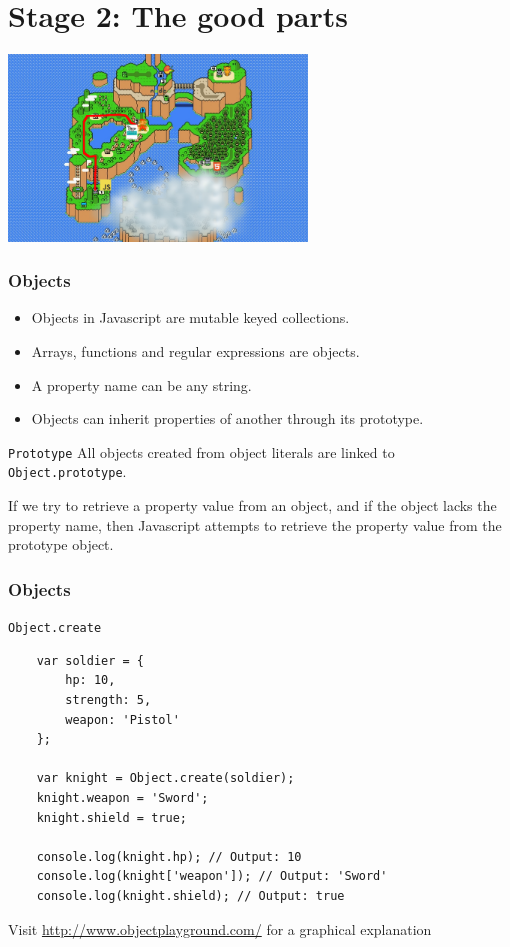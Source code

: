 \section{Stage 2: The good parts}

\begin{frame}[fragile]
  \begin{center}
    \includegraphics[width=300px]{images/map_stage_2.png}
  \end{center}
\end{frame}

\begin{frame}[fragile]
  \frametitle{Objects}
  \begin{itemize}
    \item Objects in Javascript are mutable keyed collections.
    \pause\item Arrays, functions and regular expressions are objects.
    \pause\item A property name can be any string.
    \pause\item Objects can inherit properties of another through its prototype.
  \end{itemize}

  \pause

  \begin{block}{\texttt{Prototype}}
    All objects created from object literals are linked to \texttt{Object.prototype}.
    \pause

    If we try to retrieve a property value from an object, and if the object lacks the property name, then Javascript attempts to retrieve the property value from the prototype object.
  \end{block}
\end{frame}

\begin{frame}[fragile]
  \frametitle{Objects}
  \begin{block}{\texttt{Object.create}}
    {\scriptsize
    \begin{verbatim}
    var soldier = {
        hp: 10,
        strength: 5,
        weapon: 'Pistol'
    };

    var knight = Object.create(soldier);
    knight.weapon = 'Sword';
    knight.shield = true;

    console.log(knight.hp); // Output: 10
    console.log(knight['weapon']); // Output: 'Sword'
    console.log(knight.shield); // Output: true
    \end{verbatim}
    }
  \end{block}

  Visit \url{http://www.objectplayground.com/} for a graphical explanation
\end{frame}

